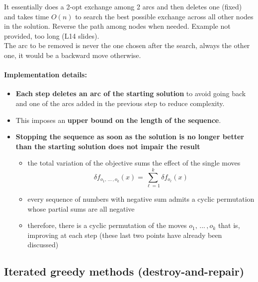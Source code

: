 It essentially does a 2-opt exchange among 2 arcs and then deletes one (fixed) and takes time $O(n)$ to search the best possible exchange across all other nodes in the solution. Reverse the path among nodes when needed. Example not provided, too long (L14 slides).\\

The arc to be removed is never the one chosen after the search, always the other one, it would be a backward move otherwise.\\

\newpage

\paragraph{Implementation details:}
\begin{itemize}
	\item \textbf{Each step deletes an arc of the starting solution} to avoid going back and one of the arcs added in the previous step to reduce complexity.\\
	
	\item This imposes an \textbf{upper bound on the length of the sequence}.\\
	
	\item \textbf{Stopping the sequence as soon as the solution is no longer better than the starting solution does not impair the result}
	\begin{itemize}
		\item the total variation of the objective sums the effect of the single moves
		$$ \delta f_{o_1, \, ... \, , o_k} (x) = \sum_{\ell = 1}^k \delta f_{o_{\ell}} (x) $$
		
		\item every sequence of numbers with negative sum admits a cyclic permutation whose partial sums are all negative
		
		\item therefore, there is a cyclic permutation of the moves $o_1, \, ... \, , o_k$ that is, improving at each step (these last two points have already been discussed)
	\end{itemize}
\end{itemize}

\newpage

\subsection{Iterated greedy methods (destroy-and-repair)}

